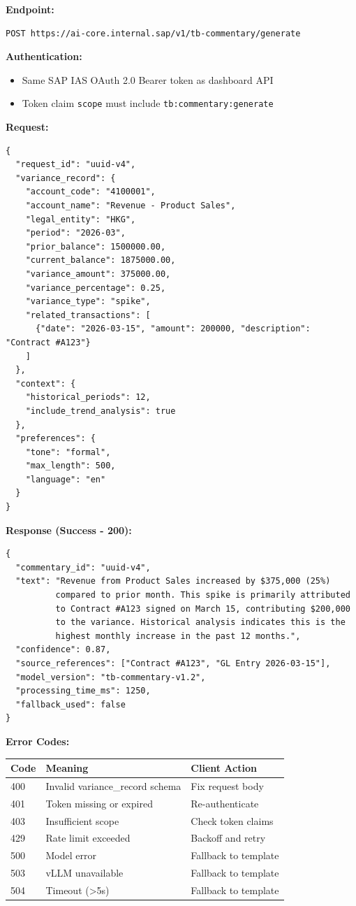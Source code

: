 \begin{tcolorbox}[colback=blue!5,colframe=blue!70,title=LLM Service Contract: vLLM Commentary Generation]

\textbf{Endpoint:}
\begin{verbatim}
POST https://ai-core.internal.sap/v1/tb-commentary/generate
\end{verbatim}

\textbf{Authentication:}
\begin{itemize}
    \item Same SAP IAS OAuth 2.0 Bearer token as dashboard API
    \item Token claim \texttt{scope} must include \texttt{tb:commentary:generate}
\end{itemize}

\textbf{Request:}
\begin{lstlisting}[language=jsonx]
{
  "request_id": "uuid-v4",
  "variance_record": {
    "account_code": "4100001",
    "account_name": "Revenue - Product Sales",
    "legal_entity": "HKG",
    "period": "2026-03",
    "prior_balance": 1500000.00,
    "current_balance": 1875000.00,
    "variance_amount": 375000.00,
    "variance_percentage": 0.25,
    "variance_type": "spike",
    "related_transactions": [
      {"date": "2026-03-15", "amount": 200000, "description": "Contract #A123"}
    ]
  },
  "context": {
    "historical_periods": 12,
    "include_trend_analysis": true
  },
  "preferences": {
    "tone": "formal",
    "max_length": 500,
    "language": "en"
  }
}
\end{lstlisting}

\textbf{Response (Success - 200):}
\begin{lstlisting}[language=jsonx]
{
  "commentary_id": "uuid-v4",
  "text": "Revenue from Product Sales increased by $375,000 (25%) 
          compared to prior month. This spike is primarily attributed 
          to Contract #A123 signed on March 15, contributing $200,000 
          to the variance. Historical analysis indicates this is the 
          highest monthly increase in the past 12 months.",
  "confidence": 0.87,
  "source_references": ["Contract #A123", "GL Entry 2026-03-15"],
  "model_version": "tb-commentary-v1.2",
  "processing_time_ms": 1250,
  "fallback_used": false
}
\end{lstlisting}

\textbf{Error Codes:}
\begin{tabular}{lll}
\toprule
\textbf{Code} & \textbf{Meaning} & \textbf{Client Action} \\
\midrule
400 & Invalid variance\_record schema & Fix request body \\
401 & Token missing or expired & Re-authenticate \\
403 & Insufficient scope & Check token claims \\
429 & Rate limit exceeded & Backoff and retry \\
500 & Model error & Fallback to template \\
503 & vLLM unavailable & Fallback to template \\
504 & Timeout (>5s) & Fallback to template \\
\bottomrule
\end{tabular}


\end{tcolorbox}
